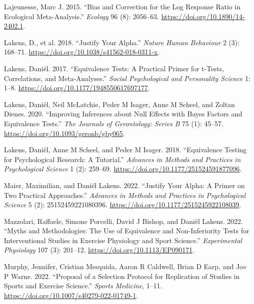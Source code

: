 \documentclass[
]{interact}
\newlength{\cslhangindent}
\newlength{\cslentryspacingunit} %
\newenvironment{CSLReferences}[2] %
 {%
  \setlength{\parindent}{0pt}
  \ifodd #1
  \let\oldpar\par
  \def\par{\hangindent=\cslhangindent\oldpar}
  \fi
  \setlength{\parskip}{#2\cslentryspacingunit}
 }%
 {}
\begin{document}
\begin{CSLReferences}{1}{0}
\leavevmode{}%
Lajeunesse, Marc J. 2015. {``Bias and Correction for the Log Response
Ratio in Ecological Meta-Analysis.''} \emph{Ecology} 96 (8): 2056--63.
\url{https://doi.org/10.1890/14-2402.1}.

\leavevmode{}%
Lakens, D., et al. 2018. {``Justify Your Alpha.''} \emph{Nature Human
Behaviour} 2 (3): 168--71.
\url{https://doi.org/10.1038/s41562-018-0311-x}.

\leavevmode{}%
Lakens, Daniël. 2017. {``Equivalence Tests: A Practical Primer for
t-Tests, Correlations, and Meta-Analyses.''} \emph{Social Psychological
and Personality Science} 1: 1--8.
\url{https://doi.org/10.1177/1948550617697177}.

\leavevmode{}%
Lakens, Daniël, Neil McLatchie, Peder M Isager, Anne M Scheel, and
Zoltan Dienes. 2020. {``Improving Inferences about Null Effects with
Bayes Factors and Equivalence Tests.''} \emph{The Journals of
Gerontology: Series B} 75 (1): 45--57.
\url{https://doi.org/10.1093/geronb/gby065}.

\leavevmode{}%
Lakens, Daniël, Anne M Scheel, and Peder M Isager. 2018. {``Equivalence
Testing for Psychological Research: A Tutorial.''} \emph{Advances in
Methods and Practices in Psychological Science} 1 (2): 259--69.
\url{https://doi.org/10.1177/251524591877096}.

\leavevmode{}%
Maier, Maximilian, and Daniël Lakens. 2022. {``Justify Your Alpha: A
Primer on Two Practical Approaches.''} \emph{Advances in Methods and
Practices in Psychological Science} 5 (2): 25152459221080396.
\url{https://doi.org/10.1177/2515245922108039}.

\leavevmode{}%
Mazzolari, Raffaele, Simone Porcelli, David J Bishop, and Daniël Lakens.
2022. {``Myths and Methodologies: The Use of Equivalence and
Non-Inferiority Tests for Interventional Studies in Exercise Physiology
and Sport Science.''} \emph{Experimental Physiology} 107 (3): 201--12.
\url{https://doi.org/10.1113/EP090171}.

\leavevmode{}%
Murphy, Jennifer, Cristian Mesquida, Aaron R Caldwell, Brian D Earp, and
Joe P Warne. 2022. {``Proposal of a Selection Protocol for Replication
of Studies in Sports and Exercise Science.''} \emph{Sports Medicine},
1--11. \url{https://doi.org/10.1007/s40279-022-01749-1}.


\end{CSLReferences}
\end{document}
